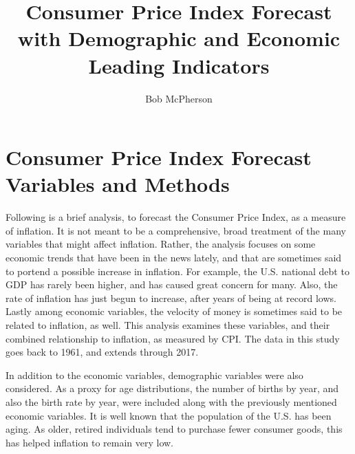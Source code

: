 \documentclass[12pt]{article}         %
\title{Consumer Price Index Forecast with Demographic and Economic Leading Indicators}  %
\author{Bob McPherson}          %
\begin{document}




\maketitle              %

\section{Consumer Price Index Forecast Variables and Methods}

Following is a brief analysis, to forecast the Consumer Price Index, as a measure of inflation.  It is not meant to be a comprehensive, broad treatment of the many variables that might affect inflation.  Rather, the analysis focuses on some economic trends that have been in the news lately, and that are sometimes said to portend a possible increase in inflation.  For example, the U.S. national debt to GDP has rarely been higher, and has caused great concern for many.  Also, the rate of inflation has just begun to increase, after years of being at record lows.  Lastly among economic variables, the velocity of money is sometimes said to be related to inflation, as well.  This analysis examines these variables, and their combined relationship to inflation, as measured by CPI.  The data in this study goes back to 1961, and extends through 2017.

In addition to the economic variables, demographic variables were also considered.  As a proxy for age distributions, the number of births by year, and also the birth rate by year, were included along with the previously mentioned economic variables.  It is well known that the population of the U.S. has been aging.  As older, retired individuals tend to purchase fewer consumer goods, this has helped inflation to remain very low.  
\end{document}
